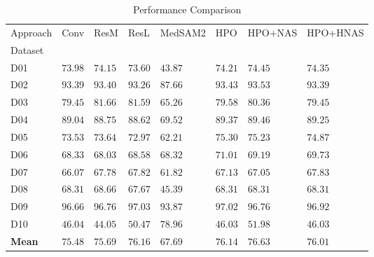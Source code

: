 \begin{table}
\caption{Performance Comparison}
\label{tab:results}
\begin{tabular}{llllllll}
\toprule
Approach & Conv & ResM & ResL & MedSAM2 & HPO & HPO+NAS & HPO+HNAS \\
Dataset &  &  &  &  &  &  &  \\
\midrule
D01 & $73.98$ & $74.15$ & $73.60$ & $43.87$ & $74.21$ & $\mathbf{74.45}$ & $74.35$ \\
D02 & $93.39$ & $93.40$ & $93.26$ & $87.66$ & $93.43$ & $\mathbf{93.53}$ & $93.39$ \\
D03 & $79.45$ & $\mathbf{81.66}$ & $81.59$ & $65.26$ & $79.58$ & $80.36$ & $79.45$ \\
D04 & $89.04$ & $88.75$ & $88.62$ & $69.52$ & $89.37$ & $\mathbf{89.46}$ & $89.25$ \\
D05 & $73.53$ & $73.64$ & $72.97$ & $62.21$ & $\mathbf{75.30}$ & $75.23$ & $74.87$ \\
D06 & $68.33$ & $68.03$ & $68.58$ & $68.32$ & $\mathbf{71.01}$ & $69.19$ & $69.73$ \\
D07 & $66.07$ & $67.78$ & $67.82$ & $61.82$ & $67.13$ & $67.05$ & $\mathbf{67.83}$ \\
D08 & $68.31$ & $\mathbf{68.66}$ & $67.67$ & $45.39$ & $68.31$ & $68.31$ & $68.31$ \\
D09 & $96.66$ & $96.76$ & $\mathbf{97.03}$ & $93.87$ & $97.02$ & $96.76$ & $96.92$ \\
D10 & $46.04$ & $44.05$ & $50.47$ & $\mathbf{78.96}$ & $46.03$ & $51.98$ & $46.03$ \\
\textbf{Mean} & $75.48$ & $75.69$ & $76.16$ & $67.69$ & $76.14$ & $\mathbf{76.63}$ & $76.01$ \\
\bottomrule
\end{tabular}
\end{table}
